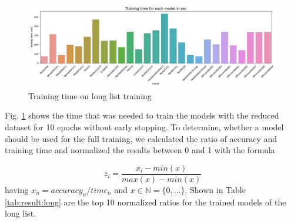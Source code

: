 \begin{figure}[h]
    \centering
    \caption{Training time on long list training}
	\label{fig:long_list_time}
    \includegraphics[width=\linewidth]{figures/long_training_time.png}
\end{figure}

Fig. \ref{fig:long_list_time} shows the time that was needed to train the models with the reduced dataset for 10 epochs without early stopping. To determine, whether a model should be used for the full training, we calculated the ratio of accuracy and training time and normalized the results between 0 and 1 with the formula

\begin{equation}
    z_i=\frac{x_i - min(x)}{max(x) - min(x)}
\end{equation}
having \begin{math} x_n = accuracy_n / time_n \end{math} and \begin{math}x \in \mathbb{N} = \{0,...\}\end{math}. Shown in Table \ref{tab:result:long} are the top 10 normalized ratios for the trained models of the long list. 

